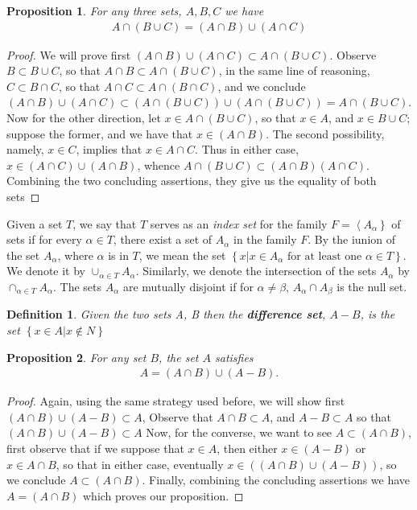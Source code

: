 \documentclass[11pt,a4paper]{article}
\newtheorem{define}{Definition}
\newtheorem{claim}{Proposition}
\begin{document}
\begin{claim}
For any three sets, $A,B,C$ we have
\begin{align*}
A \cap \left( B \cup C \right) = \left( A \cap B \right) \cup \left( A \cap C \right)
\end{align*}
\end{claim}
\begin{proof}
We will prove first $ \left( A \cap B \right) \cup \left( A \cap C \right) \subset A \cap \left( B \cup C \right) $. Observe $ B \subset B \cup C$, so that $ A \cap B \subset A \cap \left( B \cup C \right) $, in the same line of reasoning, $C \subset B \cap C$, so that $ A \cap C \subset A \cap \left( B \cap C \right) $, and we conclude $ \left( A \cap B \right) \cup \left( A \cap C \right) \subset \left( A \cap \left( B \cup C \right) \right) \cup \left( A \cap \left( B \cup C \right) \right) = A \cap \left( B \cup C \right) $.
Now for the other direction, let $x \in A \cap (B \cup C)$, so that $x \in A$, and $x \in B \cup C$; suppose the former, and we have that $ x \in ( A \cap B ) $. The second possibility, namely, $x \in C$, implies that $x \in A \cap C $. Thus in either case, $ x \in  (A \cap C) \cup (A \cap B)  $, whence $ A \cap \left( B \cup C \right) \subset \left( A \cap B \right) \left( A \cap C \right)$.
Combining the two concluding assertions, they give us the equality of both sets
\end{proof}

Given a set $T$, we say that $T$ serves as an \emph{index set} for the family $F = \left\langle A_{\alpha} \right\rbrace $ of sets if for every $ \alpha \in T$, there exist a set of $A_\alpha$ in the family $F$.
By the iunion of the set $A_\alpha$, where $\alpha$ is in $T$, we mean the set $ \left\lbrace x \vert x \in A_\alpha \text{ for  at least one } \alpha \in T \right\rbrace$. We denote it by $ \cup_{\alpha \in T} A_{\alpha} $. Similarly, we denote the intersection of the sets $A_\alpha$ by $ \cap_{\alpha \in T} A_{\alpha} $. The sets $A_\alpha$ are mutually disjoint if for $ \alpha \neq \beta$, $ A_\alpha \cap A_\beta $ is the null set.
\begin{define}
Given the two sets A, B then the 
\textbf{difference set}, $A - B$, is the set $ \left\lbrace x \in A \vert x \not\in N \right\rbrace$
\end{define}
\begin{claim}
For any set $B$, the set $A$ satisfies  
\begin{align*}
A = ( A \cap B) \cup (A - B). 
\end{align*}
\end{claim}
\begin{proof}
Again, using the same strategy used before, we will show first $ (A \cap B) \cup (A - B) \subset A $, Observe that $A \cap B \subset A$, and $ A - B \subset A$ so that $ ( A \cap B ) \cup ( A - B ) \subset A $
Now, for the converse, we want to see $ A  \subset (A \cap B)$, first observe that if we suppose that $x \in A$, then either $ x \in (A-B)$ or $x \in A \cap B$, so that in either case, eventually $x \in ((A \cap B) \cup (A - B) )$, so we conclude $ A  \subset (A \cap B) $. Finally, combining the concluding assertions we have $ A = (A \cap B) $ which proves our proposition.
\end{proof}
\end{document}

